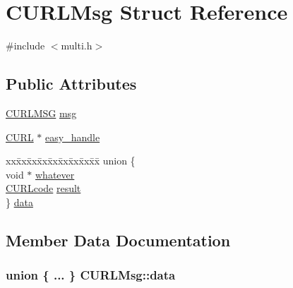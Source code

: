 \hypertarget{struct_c_u_r_l_msg}{}\section{C\+U\+R\+L\+Msg Struct Reference}
\label{struct_c_u_r_l_msg}


{\ttfamily \#include $<$multi.\+h$>$}

\subsection*{Public Attributes}
\begin{DoxyCompactItemize}
\item 
\hyperlink{multi_8h_a7f87d375fc82f79b121ef4adaeedc154}{C\+U\+R\+L\+M\+SG} \hyperlink{struct_c_u_r_l_msg_a805019ce36cd301163b184308220c601}{msg}
\item 
\hyperlink{curl_8h_ace655e3633b6533591283994d6b5cdda}{C\+U\+RL} $\ast$ \hyperlink{struct_c_u_r_l_msg_a236add50fa3dc85360e4aa7a85a9dfd1}{easy\+\_\+handle}
\item 
\begin{tabbing}
xx\=xx\=xx\=xx\=xx\=xx\=xx\=xx\=xx\=\kill
union \{\\
\>void $\ast$ \hyperlink{struct_c_u_r_l_msg_ae493c9ae3084340faf1aaa50ebf4b105}{whatever}\\
\>\hyperlink{curl_8h_af0691941698240652e0a391394217951}{CURLcode} \hyperlink{struct_c_u_r_l_msg_ac00f26a84ebe0c2c5cb420a47d15ffec}{result}\\
\} \hyperlink{struct_c_u_r_l_msg_ab2fe5a00eb1d1c3c2bd35e709b15dd92}{data}\\

\end{tabbing}\end{DoxyCompactItemize}


\subsection{Member Data Documentation}
\subsubsection[{\texorpdfstring{data}{data}}]{\setlength{\rightskip}{0pt plus 5cm}union \{ ... \}   C\+U\+R\+L\+Msg\+::data}\hypertarget{struct_c_u_r_l_msg_ab2fe5a00eb1d1c3c2bd35e709b15dd92}{}\label{struct_c_u_r_l_msg_ab2fe5a00eb1d1c3c2bd35e709b15dd92}
